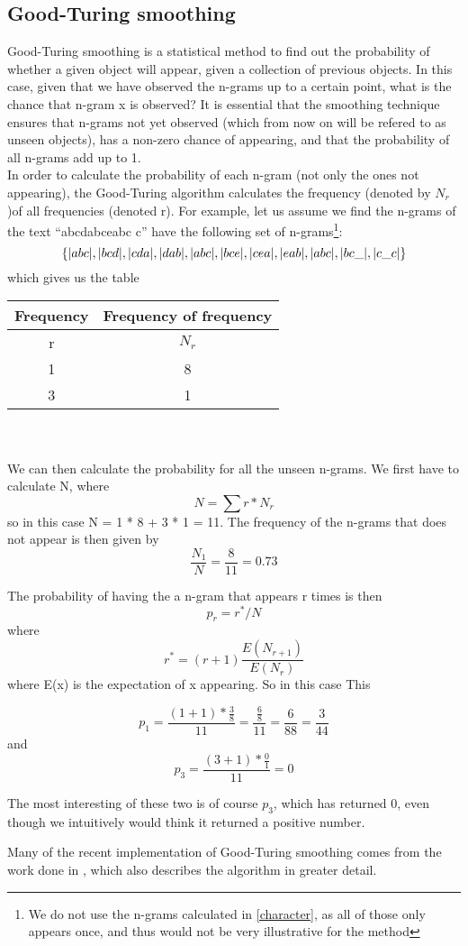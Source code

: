 \subsection{Good-Turing smoothing}
\label{Good-Turing}
Good-Turing smoothing is a statistical method to find out the probability of whether a given object will appear, given a collection of previous objects. In this case, given that we have observed the n-grams up to a certain point, what is the chance that n-gram x is observed? It is essential that the smoothing technique ensures that n-grams not yet observed (which from now on will be refered to as unseen objects), has a non-zero chance of appearing, and that the probability of all n-grams add up to 1.\\

In order to calculate the probability of each n-gram (not only the ones not appearing), the Good-Turing algorithm calculates the frequency (denoted by $N_r$)of all frequencies (denoted r). For example, let us assume we find the n-grams of the text ``abcdabceabc c'' have the following set of n-grams\footnote{We do not use the n-grams calculated in \ref{character}, as all of those only appears once, and thus would not be very illustrative for the method}:\\
$$
\{|abc|, |bcd|, |cda|, |dab|, |abc|, |bce|, |cea|, |eab|, |abc|, |bc\_|, |c\_c| \}
$$
which gives us the table\\
\begin{tabular}{|cc|}
\hline
Frequency & Frequency of frequency \\
\hline
r & $N_{r}$ \\
1 & 8\\
3 & 1\\
\hline
\end{tabular}
\\\\
We can then calculate the probability for all the unseen n-grams. We first have to calculate N, where 
$$
N = \sum r * N_r
$$
so in this case N = 1 * 8 + 3 * 1 = 11. The frequency of the n-grams that does not appear is then given by 
$$
\frac{N_1}{N} = \frac{8}{11} = 0.73
$$

The probability of having the a n-gram that appears r times is then 
$$p_r = r^*/N$$
 where 
$$r^* = (r+1)\frac{E(N_{r+1})}{E(N_r)}$$
 where E(x) is the expectation of x appearing. So in this case This 

$$p_1 = \frac{(1 + 1) * \frac{3}{8}}{11} = \frac{\frac{6}{8}}{11} = \frac{6}{88} = \frac{3}{44}$$ and  
$$p_3 = \frac{(3 + 1) * \frac{0}{1}}{11} = 0$$

The most interesting of these two is of course $p_3$, which has returned 0, even though we intuitively would think it returned a positive number.

Many of the recent implementation of Good-Turing smoothing comes from the work done in \cite{Gale94good-turingsmoothing}, which also describes the algorithm in greater detail.
